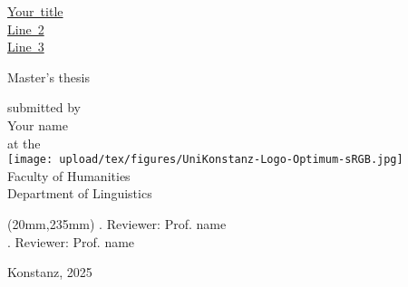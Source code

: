 \thispagestyle{empty}
\begin{center}
  \begin{sffamily}
    \begin{bfseries}
      \begin{LARGE}
	\mbox{\ul{Your title}}\\%
	\mbox{\ul{Line 2}}\\%
	\mbox{\ul{Line 3}}\\%
	\vspace{15mm}
      \end{LARGE}
      \begin{Large}
	\Large
    Master's thesis \\
      \end{Large}
    \end{bfseries}
    \begin{mdseries}
      \begin{large}
	\vspace{12mm}
	submitted by \\[0.6\baselineskip]
	Your name\\
	\vspace{12mm}
	at the\\[\baselineskip]
	{\texttt{[image: upload/tex/figures/UniKonstanz-Logo-Optimum-sRGB.jpg]}}\\
	\vspace{12mm}
	Faculty of Humanities\\[0.6\baselineskip]
	Department of Linguistics\\
      \end{large}
    \end{mdseries}
  \end{sffamily}

\end{center}

\begin{textblock*}{80mm}(20mm,235mm) %
  \large\mdseries\sffamily
  {
    . Reviewer: Prof. name \\

    . Reviewer: Prof. name
  }

      \null
  \vspace{4mm}
    \large\mdseries\sffamily
      \noindent
  Konstanz, 2025
\end{textblock*}
